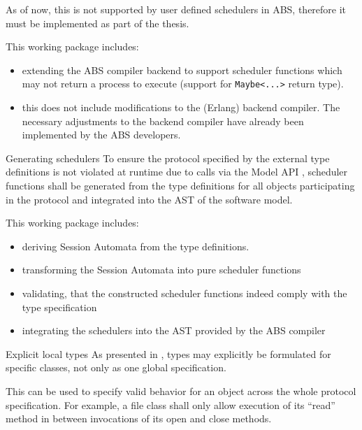 \documentclass[paper=a4,nochapname,accentcolor=tud9c]{tudexercise}
\makeatletter
\def\namedlabel#1#2{\begingroup
    #1%
    \def\@currentlabel{\thedescriptcount}%
    \phantomsection\label{#2}\endgroup
}
\newcounter{descriptcount}
\renewcommand*\thedescriptcount{[\Alph{descriptcount}]}}
\renewcommand*\thedescriptcount{\roman{descriptcount}}}
\makeatother
\begin{document}
\begin{enumdescript}
    As of now, this is not supported by user defined schedulers in ABS,
    therefore it must be implemented as part of the thesis.

    This working package includes:
    \begin{itemize}
      \item extending the ABS compiler backend to support scheduler functions which
        may not return a process to execute (support for \texttt{Maybe<...>}
        return type).
        \item this does not include modifications to the (Erlang) backend
          compiler. The necessary adjustments to the backend compiler have
          already been implemented by the ABS developers. %
    \end{itemize}
  \item[\namedlabel{Generating schedulers}{WPGenSchedulers}]%
    To ensure the protocol specified by the external type definitions is not
    violated at runtime due to calls via the Model API \cite{schlatte2018release}, scheduler functions \cite{bjork2013user}
    shall be generated from the type definitions for all objects participating
    in the protocol and integrated into the AST of the software model.

    This working package includes:
    \begin{itemize}
      \item deriving Session Automata \cite{kamburjan2016session} from the type definitions.
      \item transforming the Session Automata into pure scheduler functions \cite{bjork2013user}
      \item validating, that the constructed scheduler functions indeed comply with the
        type specification
      \item integrating the schedulers into the AST provided by the ABS compiler
    \end{itemize}
  \item[\namedlabel{Explicit local types}{WPExplicitTypes}]%
    As presented in \cite{kamburjan2016session}, types may explicitly be
    formulated for specific classes, not only as one global specification.

    This can be used to specify valid behavior for an object across the whole
    protocol specification. For example, a file class shall only allow execution
    of its ``read'' method in between invocations of its open and close methods.


\end{enumdescript}
\end{document}
